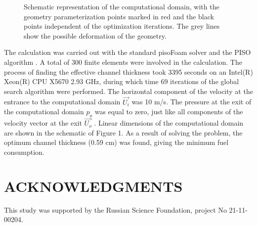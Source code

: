 \documentclass{aip-cp}
\begin{document}
\begin{figure}
\caption{Schematic representation of the computational domain, with the geometry parameterization points marked in red and the black points independent of the optimization iterations. The grey lines show the possible deformation of the geometry.}
\label{fig}
\end{figure}



The calculation was carried out with the standard pisoFoam solver and the PISO algorithm \cite{Issa1986_2,Issa1986_1}.
A total of 300 finite elements were involved in the calculation. The process of finding the effective channel thickness took 3395 seconds on an Intel(R) Xeon(R) CPU X5670 2.93 GHz, during which time 69 iterations of the global search algorithm were performed. 
The horizontal component of the velocity at the entrance to the computational domain $\vec{U_i}$  was 10 m/s. The pressure at the exit of the computational domain $p_o$ was equal to zero, just like all components of the velocity vector at the exit $\vec{U_o}$ . Linear dimensions of the computational domain are shown in the schematic of Figure 1. As a result of solving the problem, the optimum channel thickness (0.59 cm) was found, giving the minimum fuel consumption.


\section{ACKNOWLEDGMENTS}
This study was supported by the Russian Science Foundation, project No 21-11-00204.




%
%
\end{document}
